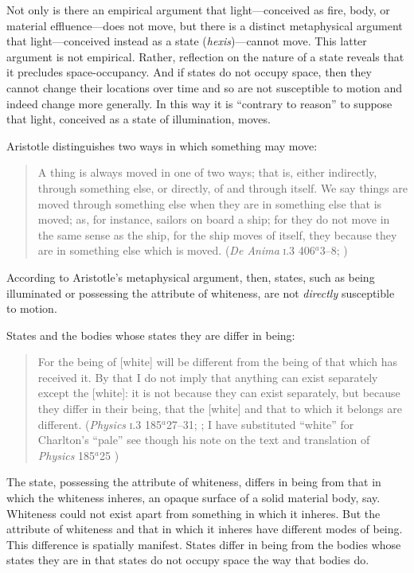 Not only is there an empirical argument that light---conceived as fire, body, or material effluence---does not move, but there is a distinct metaphysical argument that light---\-con\-ceived instead as a state (\emph{hexis})---cannot move. This latter argument is not empirical. Rather, reflection on the nature of a state reveals that it precludes space-occupancy. And if states do not occupy space, then they cannot change their locations over time and so are not susceptible to motion and indeed change more generally.  In this way it is ``contrary to reason'' to suppose that light, conceived as a state of illumination, moves. 

Aristotle distinguishes two ways in which something may move: 
\begin{quote}
	A thing is always moved in one of two ways; that is, either indirectly, through something else, or directly, of and through itself. We say things are moved through something else when they are in something else that is moved; as, for instance, sailors on board a ship; for they do not move in the same sense as the ship, for the ship moves of itself, they because they are in something else which is moved. (\emph{De Anima} \textsc{i}.3 406\( ^{a} \)3--8; \citealt[19-21]{Hicks:1907uq})
\end{quote}
According to Aristotle's metaphysical argument, then, states, such as being illuminated or possessing the attribute of whiteness, are not \emph{directly} susceptible to motion.

States and the bodies whose states they are differ in being:
\begin{quote}
	For the being of [white] will be different from the being of that which has received it. By that I do not imply that anything can exist separately except the [white]: it is not because they can exist separately, but because they differ in their being, that the [white] and that to which it belongs are different. (\emph{Physics} \textsc{i}.3 185\( ^{a} \)27--31; \citealt[5]{Charlton:1970fk}; I have substituted ``white'' for Charlton's ``pale'' see though his note on the text and translation of \emph{Physics} 185\( ^{a} \)25 \citealt[45]{Charlton:1970fk})
\end{quote}
The state, possessing the attribute of whiteness, differs in being from that in which the whiteness inheres, an opaque surface of a solid material body, say. Whiteness could not exist apart from something in which it inheres. But the attribute of whiteness and that in which it inheres have different modes of being. This difference is spatially manifest. States differ in being from the bodies whose states they are in that states do not occupy space the way that bodies do. 

